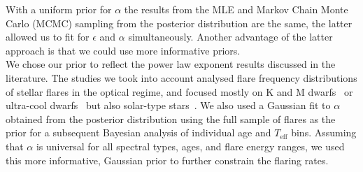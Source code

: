 \documentclass{aa}
\begin{document}
With a uniform prior for $\alpha$ the results from the MLE and Markov Chain Monte Carlo (MCMC) sampling from the posterior distribution are the same, the latter allowed us to fit for $\epsilon$ and $\alpha$ simultaneously. Another advantage of the latter approach is that we could use more informative priors. 
\\
We chose our prior to reflect the power law exponent results discussed in the literature. The studies we took into account analysed flare frequency distributions of stellar flares in the optical regime, and focused mostly on K and M dwarfs~\citep{lurie_kepler_2015,
howard_evryflare_2019, lacy_uv_1976, shakhovskaya_stellar_1989} or ultra-cool dwarfs~\citep{gizis_k2_2017} but also solar-type stars~\citep{shibayama_superflares_2013}. 
We also used a Gaussian fit to $\alpha$ obtained from the posterior distribution using the full sample of flares as the prior for a subsequent Bayesian analysis of individual age and $T_\mathrm{eff}$ bins. Assuming that $\alpha$ is universal for all spectral types, ages, and flare energy ranges, we used this more informative, Gaussian prior to further constrain the flaring rates.
\end{document}
